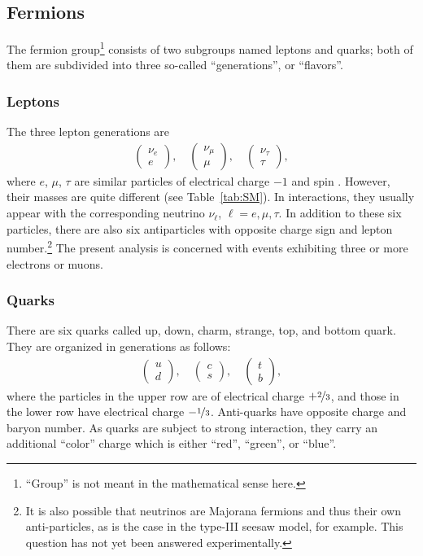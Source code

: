 \subsection{Fermions}
The fermion group\footnote{``Group'' is not meant in the mathematical sense here.} consists of two subgroups named leptons and quarks; both of them are subdivided into three so-called ``generations'', or ``flavors''.

\subsubsection*{Leptons}
The three lepton generations are
\begin{eqnarray}
	\begin{pmatrix}\nu_e \\ e \end{pmatrix}, \quad
	\begin{pmatrix}\nu_\mu \\ \mu \end{pmatrix}, \quad
	\begin{pmatrix}\nu_\tau \\ \tau \end{pmatrix},
\end{eqnarray}
where $e$, $\mu$, $\tau$ are similar particles of electrical charge $-1$ and spin . However, their masses are quite different (see Table~\ref{tab:SM}). In interactions, they usually appear with the corresponding neutrino $\nu_\ell$, $\ell = e, \mu, \tau$. In addition to these six particles, there are also six antiparticles with opposite charge sign and lepton number.\footnote{It is also possible that neutrinos are Majorana fermions and thus their own anti-particles, as is the case in the type-III seesaw model, for example. This question has not yet been answered experimentally.} The present analysis is concerned with events exhibiting three or more electrons or muons.

\subsubsection*{Quarks}
There are six quarks called up, down, charm, strange, top, and bottom quark. They are organized in generations as follows:
\begin{eqnarray}
	\begin{pmatrix}u \\ d \end{pmatrix}, \quad
	\begin{pmatrix}c \\ s \end{pmatrix}, \quad
	\begin{pmatrix}t \\ b \end{pmatrix},
\end{eqnarray}
where the particles in the upper row are of electrical charge $+\nicefrac{2}{3}$, and those in the lower row have electrical charge $-\nicefrac{1}{3}$. Anti-quarks have opposite charge and baryon number. As quarks are subject to strong interaction, they carry an additional ``color'' charge which is either ``red'', ``green'', or ``blue''.

